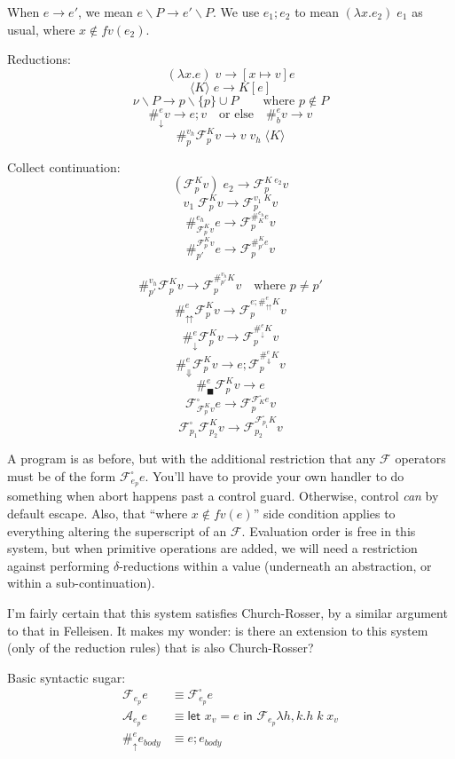 \documentclass[11pt]{article}
\newcommand\x{\lambda x}
\newcommand{\letin}[2]{\textsf{let }#1\textsf{ in }#2}
\newcommand\lseq{\mathbin\textrm{\guillemotleft}}
\newcommand\F{\mathcal{F}}
\newcommand{\angles}[1]{\langle#1\rangle}
\begin{document}
When $e \to e'$, we mean $e\backslash P \to e' \backslash P$.
We use $e_1; e_2$ to mean $(\x.e_2)\;e_1$ as usual, where $x \notin fv(e_2)$.

Reductions:
$$(\x.e)\;v \to [x \mapsto v]e$$
$$\angles K\;e \to K[e]$$
$$\nu \backslash P \to p \backslash \{p\} \cup P \qquad\textrm{where $p \notin P$}$$
$$\#^e_\downarrow v \to e; v
	\quad\textrm{or else}\quad
  \#^e_bv \to v$$
$$\#_p^{v_h}\F_p^Kv \to v\;v_h\;\angles K$$

Collect continuation:
$$(\F^K_pv)\;e_2 \to \F^{K\;e_2}_pv$$
$$v_1\;\F^K_pv \to \F^{v_1\;K}_pv$$
$$\#_{\F_p^Kv}^{e_h}e \to \F_p^{\#_K^{e_h}e}v$$
$$\#^{\F_p^Kv}_{p'}e \to \F_p^{\#^K_{p'}e}v$$

$$\#_{p'}^{v_h}\F^K_pv \to \F^{\#_{p'}^{v_h}K}_pv
  	\quad\textrm{where }p \neq p'$$
$$\#^e_\upuparrows\F^K_pv \to \F^{e;\#^e_\upuparrows K}_pv$$
$$\#^e_\downarrow \F^K_pv \to \F^{\#^e_\downarrow K}_pv$$
$$\#^e_\Downarrow \F^K_pv \to e;\F^{\#^e_\Downarrow K}_pv$$
$$\#^e_\blacksquare\F^K_pv \to e$$
$$\F^\square_{\F^K_pv}e \to \F^{\F^\square_Ke}_pv$$
$$\F^\square_{p_1}\F^K_{p_2}v \to \F^{\F^\square_{p_1}K}_{p_2}v$$


A program is as before, but with the additional restriction that any $\F$ operators must be of the form $\F^\square_{e_p}e$.
You'll have to provide your own handler to do something when abort happens past a control guard. Otherwise, control \emph{can} by default escape.
Also, that ``where $x \notin fv(e)$'' side condition applies to everything altering the superscript of an $\F$.
Evaluation order is free in this system, but when primitive operations are added, we will need a restriction against performing $\delta$-reductions within a value (underneath an abstraction, or within a sub-continuation).

I'm fairly certain that this system satisfies Church-Rosser, by a similar argument to that in Felleisen.
It makes my wonder: is there an extension to this system (only of the reduction rules) that is also Church-Rosser?

Basic syntactic sugar:
\begin{align*}
\F_{e_p}e &\equiv \F_{e_p}^\square e \\
\mathcal A_{e_p}e &\equiv
	\letin{x_v=e}{\F_{e_p}\lambda h,k.h\;k\;x_v}
	\\
\#_\uparrow^ee_{body} &\equiv
	e; e_{body}
	\\
\end{align*}
\end{document}
